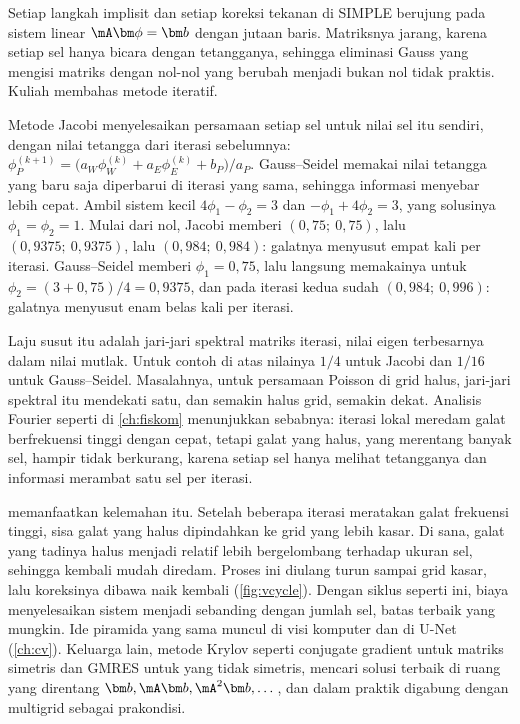 Setiap langkah implisit dan setiap koreksi tekanan di SIMPLE berujung pada sistem linear $\mA\bm\phi=\bm b$ dengan jutaan
baris. Matriksnya jarang, karena setiap sel hanya bicara dengan tetangganya, sehingga eliminasi Gauss yang mengisi
matriks dengan nol-nol yang berubah menjadi bukan nol tidak praktis. Kuliah membahas metode iteratif.

Metode Jacobi menyelesaikan persamaan setiap sel untuk nilai sel itu sendiri, dengan nilai tetangga dari iterasi
sebelumnya: $\phi_P^{(k+1)}=\big(a_W\phi_W^{(k)}+a_E\phi_E^{(k)}+b_P\big)/a_P$. Gauss--Seidel memakai nilai tetangga yang baru saja
diperbarui di iterasi yang sama, sehingga informasi menyebar lebih cepat. Ambil sistem kecil $4\phi_1-\phi_2=3$ dan
$-\phi_1+4\phi_2=3$, yang solusinya $\phi_1=\phi_2=1$. Mulai dari nol, Jacobi memberi $(0{,}75;\ 0{,}75)$, lalu
$(0{,}9375;\ 0{,}9375)$, lalu $(0{,}984;\ 0{,}984)$: galatnya menyusut empat kali per iterasi. Gauss--Seidel memberi
$\phi_1=0{,}75$, lalu langsung memakainya untuk $\phi_2=(3+0{,}75)/4=0{,}9375$, dan pada iterasi kedua sudah $(0{,}984;\ 0{,}996)$:
galatnya menyusut enam belas kali per iterasi.

Laju susut itu adalah jari-jari spektral matriks iterasi, nilai eigen terbesarnya dalam nilai mutlak. Untuk contoh di atas
nilainya $1/4$ untuk Jacobi dan $1/16$ untuk Gauss--Seidel. Masalahnya, untuk persamaan Poisson di grid halus, jari-jari
spektral itu mendekati satu, dan semakin halus grid, semakin dekat. Analisis Fourier seperti di \cref{ch:fiskom} menunjukkan
sebabnya: iterasi lokal meredam galat berfrekuensi tinggi dengan cepat, tetapi galat yang halus, yang merentang banyak sel,
hampir tidak berkurang, karena setiap sel hanya melihat tetangganya dan informasi merambat satu sel per iterasi.

 memanfaatkan kelemahan itu. Setelah beberapa iterasi meratakan galat frekuensi tinggi, sisa galat yang
halus dipindahkan ke grid yang lebih kasar. Di sana, galat yang tadinya halus menjadi relatif lebih bergelombang terhadap
ukuran sel, sehingga kembali mudah diredam. Proses ini diulang turun sampai grid kasar, lalu koreksinya dibawa naik
kembali (\cref{fig:vcycle}). Dengan siklus seperti ini, biaya menyelesaikan sistem menjadi sebanding dengan jumlah sel,
batas terbaik yang mungkin. Ide piramida yang sama muncul di visi komputer dan di U-Net (\cref{ch:cv}). Keluarga lain,
metode Krylov seperti conjugate gradient untuk matriks simetris dan GMRES untuk yang tidak simetris, mencari solusi terbaik di
ruang yang direntang $\bm b,\mA\bm b,\mA^2\bm b,\dots$, dan dalam praktik digabung dengan multigrid sebagai prakondisi.

